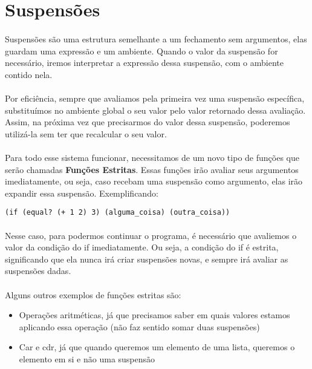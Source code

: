 \documentclass[11pt]{article}
\begin{document}
\section{Suspensões}
\label{sec:orgc1e7d55}
\paragraph{} Suspensões são uma estrutura semelhante a um fechamento sem argumentos, elas guardam uma expressão e um ambiente. Quando o
valor da suspensão for necessário, iremos interpretar a expressão dessa suspensão, com o ambiente contido nela.

\paragraph{} Por eficiência, sempre que avaliamos pela primeira vez uma suspensão específica, substituímos no ambiente global o seu valor
pelo valor retornado dessa avaliação. Assim, na próxima vez que precisarmos do valor dessa suspensão, poderemos utilizá-la sem ter que
recalcular o seu valor.

\paragraph{} Para todo esse sistema funcionar, necessitamos de um novo tipo de funções que serão chamadas \textbf{Funções Estritas}. Essas funções
irão avaliar seus argumentos imediatamente, ou seja, caso recebam uma suspensão como argumento, elas irão expandir essa suspensão.
Exemplificando:

\begin{verbatim}
(if (equal? (+ 1 2) 3) (alguma_coisa) (outra_coisa))
\end{verbatim}

\paragraph{} Nesse caso, para podermos continuar o programa, é necessário que avaliemos o valor da condição do if imediatamente. Ou seja,
a condição do if é estrita, significando que ela nunca irá criar suspensões novas, e sempre irá avaliar as suspensões dadas.

\paragraph{} Alguns outros exemplos de funções estritas são:

\begin{itemize}
\item Operações aritméticas, já que precisamos saber em quais valores estamos aplicando essa operação (não faz sentido somar duas suspensões)
\item Car e cdr, já que quando queremos um elemento de uma lista, queremos o elemento em si e não uma suspensão
\end{itemize}
\end{document}
